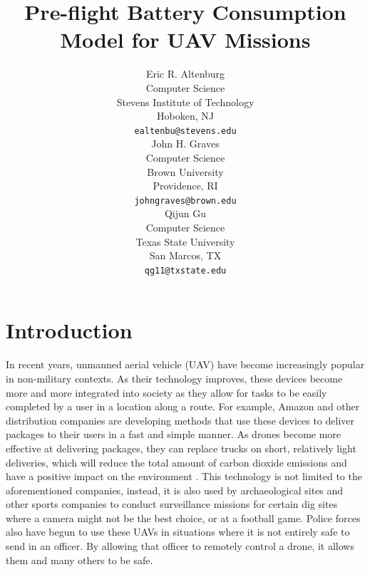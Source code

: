 \documentclass{article}
\title{Pre-flight Battery Consumption Model for UAV Missions}
\author{
Eric R. Altenburg\\
Computer Science\\
Stevens Institute of Technology\\
Hoboken, NJ \\
\texttt{ealtenbu@stevens.edu}\\
\And
John H. Graves\\
Computer Science\\
Brown University\\
Providence, RI \\
\texttt{john\textunderscore graves@brown.edu} \\
\And
Qijun Gu\\
Computer Science\\
Texas State University\\
San Marcos, TX \\
\texttt{qg11@txstate.edu}\\
}
\begin{document}
\maketitle


\begin{abstract}
\lipsum[1]
\end{abstract}




\section{Introduction}
In recent years, unmanned aerial vehicle (UAV) have become increasingly popular in non-military contexts. As their technology improves, these devices become more and more integrated into society as they allow for tasks to be easily completed by a user in a location along a route. For example, Amazon and other distribution companies are developing methods that use these devices to deliver packages to their users in a fast and simple manner. As drones become more effective at delivering packages, they can replace trucks on short, relatively light deliveries, which will reduce the total amount of carbon dioxide emissions and have a positive impact on the environment \cite{Goodchild}. This technology is not limited to the aforementioned companies, instead, it is also used by archaeological sites and other sports companies to conduct surveillance missions for certain dig sites where a camera might not be the best choice, or at a football game. Police forces also have begun to use these UAVs in situations where it is not entirely safe to send in an officer. By allowing that officer to remotely control a drone, it allows them and many others to be safe.\par
\end{document}
